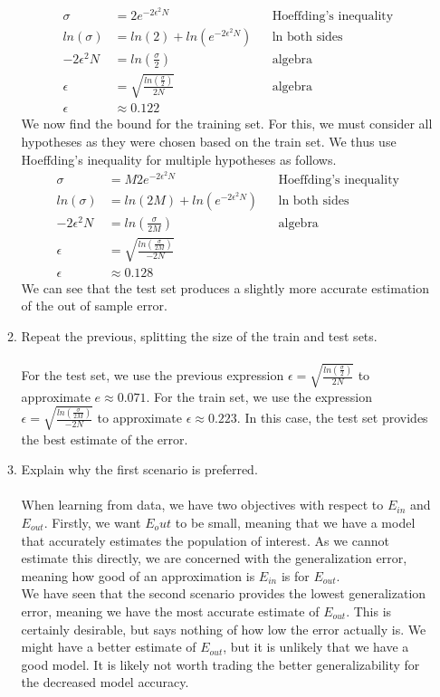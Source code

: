 \documentclass{article}
\begin{document}
\begin{enumerate}
\begin{enumerate}
		\begin{align}
		\sigma &= 2e^{-2\epsilon^2N} && \text{Hoeffding's inequality} \\
		ln(\sigma) &= ln(2) + ln(e^{-2\epsilon^2N}) && \text{ln both sides} \\
		-2\epsilon^2N &= ln(\frac{\sigma}{2}) && \text{algebra} \\
		\epsilon &= \sqrt{\frac{ln(\frac{\sigma}{2})}{2N}} && \text{algebra} \\
		\epsilon &\approx 0.122
		\end{align}
		We now find the bound for the training set. For this, we must consider all hypotheses as they were chosen based on the train set. We thus use Hoeffding's inequality for multiple hypotheses as follows.
		\begin{align}
		\sigma &= M2e^{-2\epsilon^2N} && \text{Hoeffding's inequality} \\
		ln(\sigma) &= ln(2M) + ln(e^{-2\epsilon^2N}) && \text{ln both sides} \\
		-2\epsilon^2N &= ln(\frac{\sigma}{2M}) && \text{algebra} \\
		\epsilon &= \sqrt{\frac{ln(\frac{\sigma}{2M})}{-2N}} \\
		\epsilon &\approx 0.128
		\end{align}
		We can see that the test set produces a slightly more accurate estimation of the out of sample error.
		\item Repeat the previous, splitting the size of the train and test sets.
		\\\\ For the test set, we use the previous expression $\epsilon = \sqrt{\frac{ln(\frac{\sigma}{2})}{2N}}$ to approximate $e\approx0.071$. For the train set, we use the expression $\epsilon = \sqrt{\frac{ln(\frac{\sigma}{2M})}{-2N}}$ to approximate $\epsilon\approx 0.223$. In this case, the test set provides the best estimate of the error.
		\item Explain why the first scenario is preferred.
		\\\\ When learning from data, we have two objectives with respect to $E_{in}$ and $E_{out}$. Firstly, we want $E_out$ to be small, meaning that we have a model that accurately estimates the population of interest. As we cannot estimate this directly, we are concerned with the generalization error, meaning how good of an approximation is $E_{in}$ is for $E_{out}$.
		\\ We have seen that the second scenario provides the lowest generalization error, meaning we have the most accurate estimate of $E_{out}$. This is certainly desirable, but says nothing of how low the error actually is. We might have a better estimate of $E_{out}$, but it is unlikely that we have a good model. It is likely not worth trading the better generalizability for the decreased model accuracy.
	\end{enumerate}
\end{enumerate}
	
\end{document}
